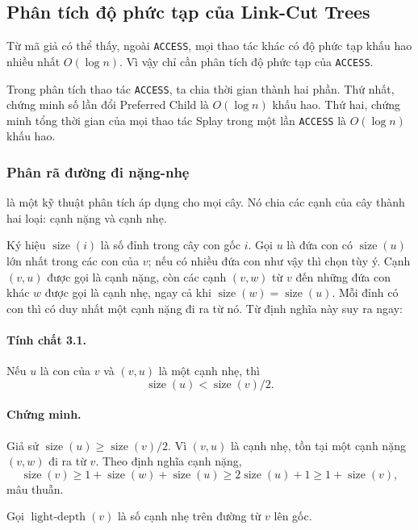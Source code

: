 \documentclass[11pt]{article}
\begin{document}
\subsection{Phân tích độ phức tạp của Link-Cut Trees}

Từ mã giả có thể thấy, ngoài \texttt{ACCESS}, mọi thao tác khác có độ phức tạp
khấu hao nhiều nhất $O(\log n)$. Vì vậy chỉ cần phân tích độ phức tạp của
\texttt{ACCESS}.

Trong phân tích thao tác \texttt{ACCESS}, ta chia thời gian thành hai phần.
Thứ nhất, chứng minh số lần đổi Preferred Child là $O(\log n)$ khấu hao. Thứ
hai, chứng minh tổng thời gian của mọi thao tác Splay trong một lần
\texttt{ACCESS} là $O(\log n)$ khấu hao.

\subsubsection{Phân rã đường đi nặng-nhẹ}

 là một kỹ thuật phân tích áp dụng cho mọi cây.
Nó chia các cạnh của cây thành hai loại: cạnh nặng và cạnh nhẹ.

Ký hiệu $\operatorname{size}(i)$ là số đỉnh trong cây con gốc $i$. Gọi $u$ là
đứa con có $\operatorname{size}(u)$ lớn nhất trong các con của $v$; nếu có
nhiều đứa con như vậy thì chọn tùy ý. Cạnh $(v,u)$ được gọi là cạnh nặng, còn
các cạnh $(v,w)$ từ $v$ đến những đứa con khác $w$ được gọi là cạnh nhẹ, ngay
cả khi $\operatorname{size}(w)=\operatorname{size}(u)$. Mỗi đỉnh có con thì có
duy nhất một cạnh nặng đi ra từ nó. Từ định nghĩa này suy ra ngay:

\paragraph{Tính chất 3.1.}
Nếu $u$ là con của $v$ và $(v,u)$ là một cạnh nhẹ, thì
\[
  \operatorname{size}(u) < \operatorname{size}(v)/2.
\]

\paragraph{Chứng minh.}
Giả sử $\operatorname{size}(u)\ge \operatorname{size}(v)/2$. Vì $(v,u)$ là
cạnh nhẹ, tồn tại một cạnh nặng $(v,w)$ đi ra từ $v$. Theo định nghĩa cạnh
nặng,
\[
  \operatorname{size}(v)
  \ge 1+\operatorname{size}(w)+\operatorname{size}(u)
  \ge 2\operatorname{size}(u)+1
  \ge 1+\operatorname{size}(v),
\]
mâu thuẫn.

Gọi $\operatorname{light\mbox{-}depth}(v)$ là số cạnh nhẹ trên đường từ $v$ lên
gốc.
\end{document}
